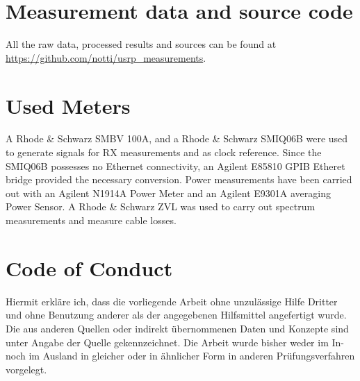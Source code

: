 \documentclass[12pt,a4paper,parskip=full,abstracton]{scrartcl}
\begin{document}
\clearpage
\begin{appendix}
\section{Measurement data and source code}
\label{sec:sources}
All the raw data, processed results and sources can be found at
\url{https://github.com/notti/usrp_measurements}.
\section{Used Meters}
\label{sec:meters}
A Rhode \& Schwarz SMBV 100A, and a Rhode \& Schwarz SMIQ06B were used to generate
signals for RX measurements and as clock reference. Since the SMIQ06B possesses no
Ethernet connectivity, an Agilent E85810 GPIB Etheret bridge provided the necessary
conversion. Power measurements have been carried out with an Agilent N1914A Power Meter and an
Agilent E9301A averaging Power Sensor. A Rhode \& Schwarz ZVL was used to carry out
spectrum measurements and measure cable losses.

\printglossary[type=\acronymtype]

\listoffigures



\end{appendix}

\clearpage
\section*{Code of Conduct}
Hiermit erkl\"are ich, dass die vorliegende Arbeit ohne unzul\"assige Hilfe Dritter und ohne Benutzung
anderer als der angegebenen Hilfsmittel angefertigt wurde. Die aus anderen Quellen oder indirekt
\"ubernommenen Daten und Konzepte sind unter Angabe der Quelle gekennzeichnet.
Die Arbeit wurde bisher weder im In- noch im Ausland in gleicher oder in \"ahnlicher Form in anderen
Pr\"ufungsverfahren vorgelegt.

\par\noindent\makebox[7cm]{\hrulefill}      \hfill\makebox[5cm]{\hrulefill}%
\par\noindent{} \hfill{}%
\end{document}
